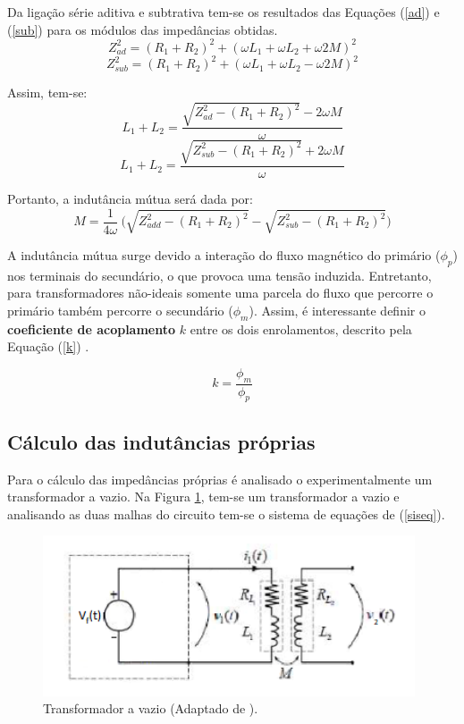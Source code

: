 \documentclass[a4paper,12pt,oneside,openany,table,xcdraw]{article}
\begin{document}
Da ligação série aditiva e subtrativa tem-se os resultados das Equações (\ref{ad}) e (\ref{sub}) para os módulos das impedâncias obtidas.
\begin{equation}\label{ad}
Z_{ad}^2=(R_1+R_2)^2+(\omega L_1+\omega L_2+\omega2M)^2
\end{equation}
\begin{equation}\label{sub}
Z_{sub}^2=(R_1+R_2)^2+(\omega L_1+\omega L_2-\omega2M)^2
\end{equation}

Assim, tem-se:
\begin{equation}
L_1+L_2=\dfrac{\sqrt{Z_{ad}^2-(R_1+R_2)^2}-2\omega M}{\omega}
\end{equation}
\begin{equation}
L_1+L_2=\dfrac{\sqrt{Z_{sub}^2-(R_1+R_2)^2}+2\omega M}{\omega}
\end{equation}
\vspace{0.1cm}

Portanto, a indutância mútua será dada por:
\begin{equation}\label{mutua}
M = \dfrac{1}{4\omega}\ \bigg(\sqrt{Z_{add}^2-(R_1+R_2)^2} - \sqrt{Z_{sub}^2-(R_1+R_2)^2}\bigg)
\end{equation}
\vspace{0.01cm}

A indutância mútua surge devido a interação do fluxo magnético do primário ($\phi_p$) nos terminais do secundário, o que provoca uma tensão induzida. Entretanto, para transformadores não-ideais somente uma parcela do fluxo que percorre o primário também percorre o secundário ($\phi_m$). Assim, é interessante definir o \textbf{coeficiente de acoplamento} $k$ entre os dois enrolamentos, descrito pela Equação (\ref{k}) \cite{boylestad}.

\begin{equation}\label{k}
k = \dfrac{\phi_m}{\phi_p}
\end{equation}
\vspace{0.1cm}


\subsection{Cálculo das indutâncias próprias}
Para o cálculo das impedâncias próprias é analisado o experimentalmente um transformador a vazio. Na Figura \ref{vazio}, tem-se um transformador a vazio  e analisando as duas malhas do circuito tem-se o sistema de equações de (\ref{siseq}).

\begin{figure}[H]
\centering
\captionsetup{font=scriptsize}
\includegraphics[width=11cm]{tvazio}
\caption{Transformador a vazio (Adaptado de \cite{exp}).}
\label{vazio}
\end{figure}
\end{document}
